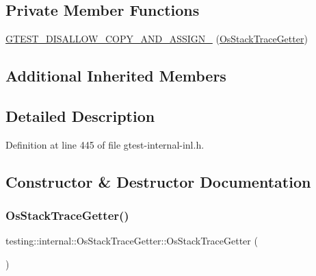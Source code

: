 \subsection*{Private Member Functions}
\begin{DoxyCompactItemize}
\item 
\hyperlink{classtesting_1_1internal_1_1OsStackTraceGetter_a51caf2b97d8ef86e5e279387bbab1278}{G\+T\+E\+S\+T\+\_\+\+D\+I\+S\+A\+L\+L\+O\+W\+\_\+\+C\+O\+P\+Y\+\_\+\+A\+N\+D\+\_\+\+A\+S\+S\+I\+G\+N\+\_\+} (\hyperlink{classtesting_1_1internal_1_1OsStackTraceGetter}{Os\+Stack\+Trace\+Getter})
\end{DoxyCompactItemize}
\subsection*{Additional Inherited Members}


\subsection{Detailed Description}


Definition at line 445 of file gtest-\/internal-\/inl.\+h.



\subsection{Constructor \& Destructor Documentation}
\mbox{\label{classtesting_1_1internal_1_1OsStackTraceGetter_aa40b3120c0ae4ec640de8b577ab7da17}} 
\subsubsection{\texorpdfstring{Os\+Stack\+Trace\+Getter()}{OsStackTraceGetter()}}
{\footnotesize\ttfamily testing\+::internal\+::\+Os\+Stack\+Trace\+Getter\+::\+Os\+Stack\+Trace\+Getter (\begin{DoxyParamCaption}{ }\end{DoxyParamCaption})\hspace{0.3cm}{\ttfamily [inline]}}



